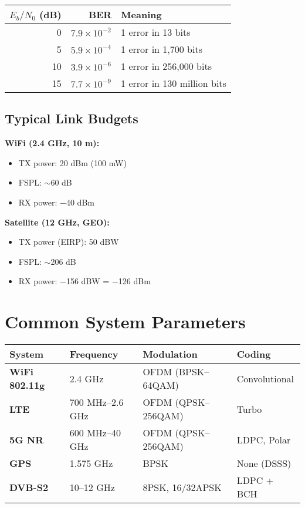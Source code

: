 \begin{center}
\begin{tabular}{@{}rrl@{}}
\toprule
$E_b/N_0$ (dB) & BER & Meaning \\
\midrule
0 & $7.9 \times 10^{-2}$ & 1 error in 13 bits \\
5 & $5.9 \times 10^{-4}$ & 1 error in 1,700 bits \\
10 & $3.9 \times 10^{-6}$ & 1 error in 256,000 bits \\
15 & $7.7 \times 10^{-9}$ & 1 error in 130 million bits \\
\bottomrule
\end{tabular}
\end{center}

\subsection{Typical Link Budgets}

\textbf{WiFi (2.4 GHz, 10 m):}
\begin{itemize}
\item TX power: 20 dBm (100 mW)
\item FSPL: $\sim$60 dB
\item RX power: $-$40 dBm
\end{itemize}

\textbf{Satellite (12 GHz, GEO):}
\begin{itemize}
\item TX power (EIRP): 50 dBW
\item FSPL: $\sim$206 dB
\item RX power: $-$156 dBW = $-$126 dBm
\end{itemize}

\section{Common System Parameters}
\label{sec:common-systems}

\begin{center}
\small
\begin{tabular}{@{}llll@{}}
\toprule
System & Frequency & Modulation & Coding \\
\midrule
\textbf{WiFi 802.11g} & 2.4 GHz & OFDM (BPSK--64QAM) & Convolutional \\
\textbf{LTE} & 700 MHz--2.6 GHz & OFDM (QPSK--256QAM) & Turbo \\
\textbf{5G NR} & 600 MHz--40 GHz & OFDM (QPSK--256QAM) & LDPC, Polar \\
\textbf{GPS} & 1.575 GHz & BPSK & None (DSSS) \\
\textbf{DVB-S2} & 10--12 GHz & 8PSK, 16/32APSK & LDPC + BCH \\
\bottomrule
\end{tabular}
\end{center}

